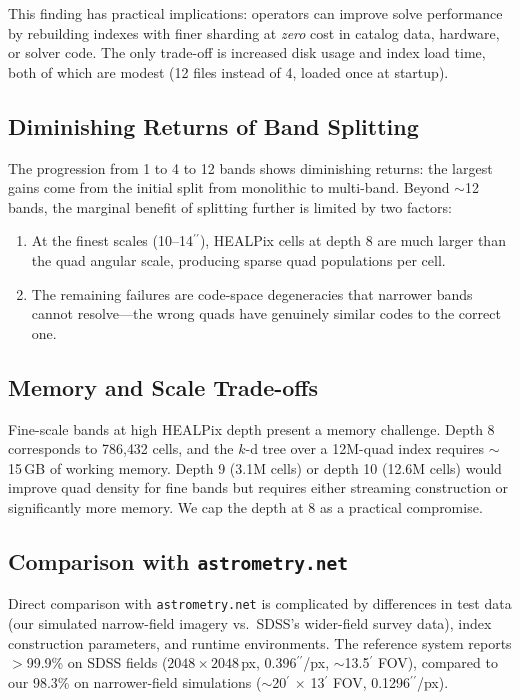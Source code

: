\documentclass[twocolumn, 10pt]{article}
\newcommand{\arcsec}{\ensuremath{^{\prime\prime}}}
\newcommand{\arcmin}{\ensuremath{^{\prime}}}
\begin{document}
This finding has practical implications: operators can improve solve
performance by rebuilding indexes with finer sharding at \emph{zero}
cost in catalog data, hardware, or solver code. The only trade-off is
increased disk usage and index load time, both of which are modest
(12 files instead of 4, loaded once at startup).

\subsection{Diminishing Returns of Band Splitting}

The progression from 1 to 4 to 12 bands shows diminishing returns:
the largest gains come from the initial split from monolithic to
multi-band. Beyond $\sim$12 bands, the marginal benefit of splitting
further is limited by two factors:
\begin{enumerate}
    \item At the finest scales (10--14\arcsec), HEALPix cells at depth
          8 are much larger than the quad angular scale, producing sparse
          quad populations per cell.
    \item The remaining failures are code-space degeneracies that
          narrower bands cannot resolve---the wrong quads have genuinely
          similar codes to the correct one.
\end{enumerate}

\subsection{Memory and Scale Trade-offs}

Fine-scale bands at high HEALPix depth present a memory challenge.
Depth 8 corresponds to 786{,}432 cells, and the $k$-d tree over a
12M-quad index requires $\sim$15\,GB of working memory. Depth 9
(3.1M cells) or depth 10 (12.6M cells) would improve quad density
for fine bands but requires either streaming construction or
significantly more memory. We cap the depth at 8 as a practical
compromise.

\subsection{Comparison with \texttt{astrometry.net}}

Direct comparison with \texttt{astrometry.net} is complicated by
differences in test data (our simulated narrow-field imagery vs.\
SDSS's wider-field survey data), index construction parameters, and
runtime environments. The reference system reports $>$99.9\% on
SDSS fields ($2048 \times 2048$\,px, 0.396\arcsec/px,
$\sim$13.5\arcmin{} FOV), compared to our 98.3\% on
narrower-field simulations ($\sim$20\arcmin{} $\times$
13\arcmin{} FOV, 0.1296\arcsec/px).
\end{document}
